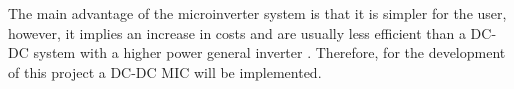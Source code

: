 The main advantage of the microinverter system is that it is simpler for the user, however, it implies an increase in costs and are usually less efficient than a DC-DC system with a higher power general inverter \cite{ArchitectureMIC}. Therefore, for the development of this project a DC-DC MIC will be implemented. 


